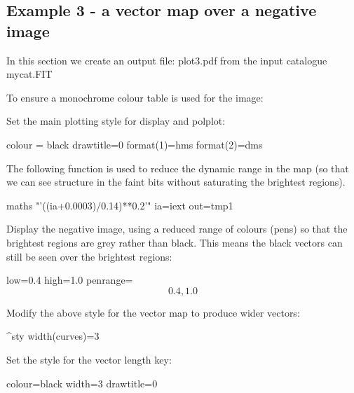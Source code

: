 \subsection{ Example 3 - a vector map over a negative image}
\label{section:kappa-example3}


In this section we create an output file: plot3.pdf from the input catalogue mycat.FIT

\begin{terminalv}
\end{terminalv}


To ensure a monochrome colour table is used for the image:

\begin{terminalv}
\end{terminalv}


Set the main plotting style for display and polplot:

\begin{terminalv}
colour = black
drawtitle=0
format(1)=hms
format(2)=dms
\end{terminalv}


The following function is used to reduce the dynamic range in the map (so
that we can see structure in the faint bits without saturating the
brightest regions).

\begin{terminalv}
maths "'((ia+0.0003)/0.14)**0.2'" ia=iext out=tmp1
\end{terminalv}


Display the negative image, using a reduced range of colours
(pens) so that the brightest regions are grey rather than black.
This means the black vectors can still be seen over the brightest
regions:

\begin{terminalv}
        low=0.4 high=1.0
        penrange=\[0.4,1.0\]
\end{terminalv}


Modify the above style for the vector map to produce wider vectors:

\begin{terminalv}
^sty
width(curves)=3
\end{terminalv}


Set the style for the vector length key:

\begin{terminalv}
colour=black
width=3
drawtitle=0
\end{terminalv}



